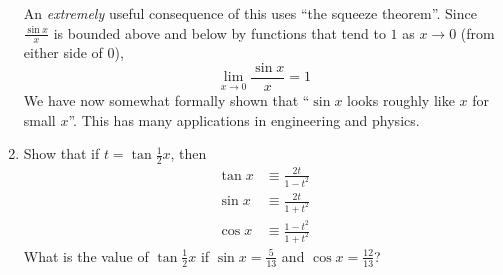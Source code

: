 \begin{enumerate}
  An \emph{extremely} useful consequence of this uses ``the squeeze theorem''.
  Since \(\frac{\sin x} x\) is bounded above and below by functions that tend to
  \(1\) as \(x \to 0\) (from either side of \(0\)),
  \begin{equation*}
   \lim_{x \to 0} \frac{\sin x}x = 1
  \end{equation*}
  We have now somewhat formally shown that ``\(\sin x\) looks roughly like \(x\)
  for small \(x\)''. This has many applications in engineering and physics.
 \item \label{q_trig_weierstrass}
  Show that if \(t = \tan \frac 12 x\), then
  \begin{align*}
   \tan x &\equiv \frac{2t}{1 - t^2} \\
   \sin x &\equiv \frac{2t}{1 + t^2} \\
   \cos x &\equiv \frac{1 - t^2}{1 + t^2}
  \end{align*}
  What is the value of \(\tan \frac 12 x\) if \(\sin x = \frac 5{13}\) and
  \(\cos x = \frac{12}{13}\)?
\end{enumerate}
